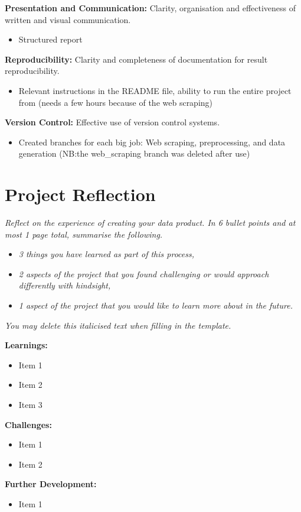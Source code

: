 \documentclass[a4paper, 12pt]{article}
\begin{document}
\textbf{Presentation and Communication:} Clarity, organisation and effectiveness of written and visual communication.

\begin{itemize}
    \item Structured report 
\end{itemize}

\textbf{Reproducibility:} Clarity and completeness of documentation for result reproducibility.

\begin{itemize}
    \item Relevant instructions in the README file, ability to run the entire project from (needs a few hours because of the web scraping)
\end{itemize}

\textbf{Version Control:} Effective use of version control systems.

\begin{itemize}
    \item Created branches for each big job: Web scraping, preprocessing, and data generation (NB:the web_scraping branch was deleted after use)
\end{itemize}

\pagebreak

\section{Project Reflection}

\textit{Reflect on the experience of creating your data product. In 6 bullet points and at most 1 page total, summarise the following.} 

\begin{itemize}
    \item \textit{3 things you have learned as part of this process,}
    \item \textit{2 aspects of the project that you found challenging or would approach differently with hindsight,} 
    \item \textit{1 aspect of the project that you would like to learn more about in the future.}
\end{itemize}

\textit{You may delete this italicised text when filling in the template.} 

\textbf{Learnings:}

\begin{itemize}
    \item Item 1
    \item Item 2
    \item Item 3
\end{itemize}

\textbf{Challenges:}

\begin{itemize}
    \item Item 1
    \item Item 2
\end{itemize}

\textbf{Further Development:}

\begin{itemize}
    \item Item 1
\end{itemize}
\end{document}
